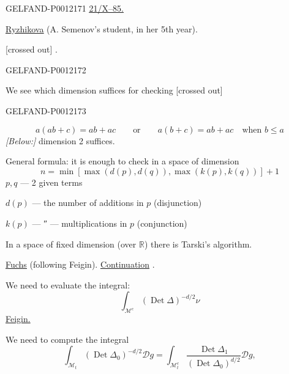 \begin{GelfandAdjacentEvidence}{GELFAND-P001217}{1}
\underline{\underline{21/X--85.}}\qquad {}

\underline{\underline{Ryzhikova}} (A. Semenov’s student, in her 5th year).

 [crossed out] .
\end{GelfandAdjacentEvidence}
\begin{GelfandAdjacentEvidence}{GELFAND-P001217}{2}


We see which dimension suffices for checking [crossed out]
\end{GelfandAdjacentEvidence}
\begin{GelfandAdjacentEvidence}{GELFAND-P001217}{3}

\[
a(ab+c)=ab+ac\qquad\text{or}\qquad
a(b+c)=ab+ac\quad\text{when }b\leq a
\]
\textit{[Below:]} dimension 2 suffices.

General formula: it is enough to check in a space of dimension
\[
n=\min[\max(d(p),d(q)),\max(k(p),k(q))]+1
\]
\(p,q\) --- 2 given terms

\(d(p)\) --- the number of additions in \(p\) (disjunction)

\(k(p)\) --- ″ --- multiplications in \(p\) (conjunction)

In a space of fixed dimension (over \(\mathbb R\)) there is Tarski’s algorithm.

\underline{\underline{Fuchs}} (following Feigin). \underline{Continuation} .

We need to evaluate the integral:
\begin{equation*}
\int_{\mathcal M^c}(\operatorname{Det}\Delta)^{-d/2}\nu\tag{1}
\end{equation*}
\underline{Feigin.}

We need to compute the integral
\begin{equation*}
\int_{\mathcal M_t}(\operatorname{Det}\Delta_0)^{-d/2}\mathcal Dg
=\int_{\mathcal M_t^c}\frac{\operatorname{Det}\Delta_1}{(\operatorname{Det}\Delta_0)^{d/2}}\mathcal Dg,\tag{2}
\end{equation*}
\end{GelfandAdjacentEvidence}
